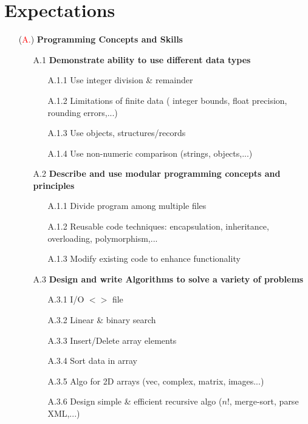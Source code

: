 \documentclass{report}
\begin{document}
\section{Expectations}
\newcommand{\expectation}[1]{(#1)}
\newcommand{\xpecA}[1]{ \expectation{\textcolor{red}{#1}} }
\newcommand{\xpecB}[1]{ \expectation{\textcolor{blue}{#1}} }
\newcommand{\xpecC}[1]{ \expectation{\textcolor{magenta}{#1}} }
\newcommand{\xpecD}[1]{ \expectation{\textcolor{green}{#1}} }
\begin{enumerate}
\item[\xpecA{A.}] {\bf Programming Concepts and Skills }
	\begin{enumerate}
	\item[A.1] {\bf Demonstrate ability to use different data types }
		\begin{enumerate}
		\item[A.1.1] Use integer division \& remainder 
		\item[A.1.2] Limitations of finite data ( integer bounds, float precision, rounding errors,...)
		\item[A.1.3] Use objects, structures/records
		\item[A.1.4] Use non-numeric comparison (strings, objects,...)
		\end{enumerate}
	\item[A.2] {\bf Describe and use modular programming concepts and principles }
		\begin{enumerate}
		\item[A.1.1] Divide program among multiple files
		\item[A.1.2] Reusable code techniques: encapsulation, inheritance, overloading, polymorphism,...
		\item[A.1.3] Modify existing code to enhance functionality
		\end{enumerate}
	\item[A.3] {\bf Design and write Algorithms to solve a variety of problems }
		\begin{enumerate}
		\item[A.3.1] I/O $<>$ file
		\item[A.3.2] Linear \& binary search
		\item[A.3.3] Insert/Delete array elements
		\item[A.3.4] Sort data in array
		\item[A.3.5] Algo for 2D arrays (vec, complex, matrix, images...)
		\item[A.3.6] Design simple \& efficient recursive algo ($n!$, merge-sort, parse XML,...)

\end{enumerate}
\end{enumerate}
\end{enumerate}
\end{document}

